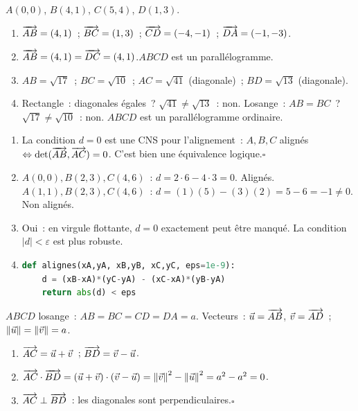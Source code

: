 
$A(0,0)$, $B(4,1)$, $C(5,4)$, $D(1,3)$.
\begin{enumerate}
  \item $\overrightarrow{AB}=(4,1)$~; $\overrightarrow{BC}=(1,3)$~; $\overrightarrow{CD}=(-4,-1)$~; $\overrightarrow{DA}=(-1,-3)$.
  \item $\overrightarrow{AB}=(4,1)=\overrightarrow{DC}=(4,1)$.\checkmark\quad $ABCD$ est un parall\'elogramme.
  \item $AB=\sqrt{17}$~; $BC=\sqrt{10}$~;
        $AC=\sqrt{41}$ (diagonale)~; $BD=\sqrt{13}$ (diagonale).
  \item Rectangle~: diagonales \'egales~? $\sqrt{41}\ne\sqrt{13}$~: non.
        Losange~: $AB=BC$~? $\sqrt{17}\ne\sqrt{10}$~: non.
        $ABCD$ est un parall\'elogramme ordinaire.
\end{enumerate}


\begin{enumerate}
  \item La condition $d=0$ est une CNS pour l'alignement~:
        $A,B,C$ align\'es $\Leftrightarrow\det(\overrightarrow{AB},\overrightarrow{AC})=0$.
        C'est bien une \'equivalence logique.\hfill$\square$
  \item $A(0,0),B(2,3),C(4,6)$~: $d=2\cdot6-4\cdot3=0$. Align\'es.\checkmark\quad
        $A(1,1),B(2,3),C(4,6)$~: $d=(1)(5)-(3)(2)=5-6=-1\ne0$. Non align\'es.\checkmark
  \item Oui~: en virgule flottante, $d=0$ exactement peut \^etre manqu\'e.
        La condition $|d|<\varepsilon$ est plus robuste.
  \item
\begin{lstlisting}[language=Python]
def alignes(xA,yA, xB,yB, xC,yC, eps=1e-9):
    d = (xB-xA)*(yC-yA) - (xC-xA)*(yB-yA)
    return abs(d) < eps
\end{lstlisting}
\end{enumerate}


$ABCD$ losange~: $AB=BC=CD=DA=a$. Vecteurs~: $\vec{u}=\overrightarrow{AB}$, $\vec{v}=\overrightarrow{AD}$~;
$\left\|\vec{u}\right\|=\left\|\vec{v}\right\|=a$.
\begin{enumerate}
  \item $\overrightarrow{AC}=\vec{u}+\vec{v}$~; $\overrightarrow{BD}=\vec{v}-\vec{u}$.
  \item $\overrightarrow{AC}\cdot\overrightarrow{BD}=(\vec{u}+\vec{v})\cdot(\vec{v}-\vec{u})
        =\left\|\vec{v}\right\|^2-\left\|\vec{u}\right\|^2=a^2-a^2=0$.
  \item $\overrightarrow{AC}\perp\overrightarrow{BD}$~: les diagonales sont perpendiculaires.\hfill$\square$
\end{enumerate}

